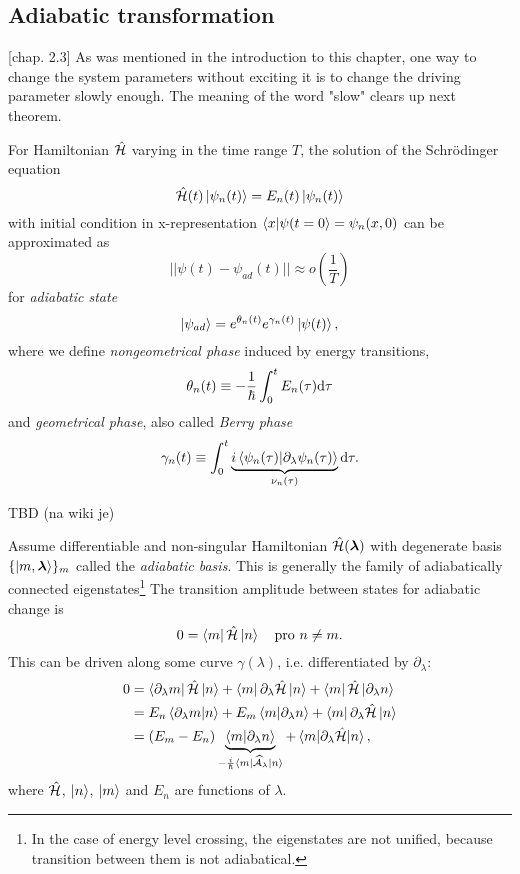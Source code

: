 \subsection{Adiabatic transformation}
\citep{kolodrubez}[chap. 2.3]
As was mentioned in the introduction to this chapter, one way to change the system parameters without exciting it is to change the driving parameter slowly enough. The meaning of the word "slow" clears up next theorem.
\begin{thm}
    For Hamiltonian $\hat{\mathcal{H}}$ varying in the time range $T$, the solution of the Schrödinger equation 
    $$\hat{\mathcal{H}}(t)\ket{\psi_n(t)} = E_n(t)\ket{\psi_n(t)}$$
    with initial condition in x-representation $\braket{x|\psi(t=0}=\psi_n(x,0)$ can be approximated as
    \begin{equation}
      ||\psi(t) - \psi_{ad}(t)||\approx o\left(\frac{1}{T}\right)
    \end{equation}
    for \emph{adiabatic state}
    \begin{equation}
        \ket{\psi_{ad}}= e^{\theta_n(t)}e^{\gamma_n(t)}\ket{\psi(t)},
    \end{equation}
    where we define \emph{nongeometrical phase} induced by energy transitions,
    $$\theta_n(t)\equiv -\frac{1}{\hbar}\int_0^t E_n(\tau)\mathrm{d} \tau$$
    and \emph{geometrical phase}, also called \emph{Berry phase}
        $$\gamma_n(t)\equiv \int_0^t \underbrace{i\braket{\psi_n(\tau)|\partial_\lambda\psi_n(\tau)}}_{\nu_n(\tau)} \mathrm{d} \tau .$$
\end{thm}
\begin{myproof}
    TBD (na wiki je)
\end{myproof}
Assume differentiable and non-singular Hamiltonian $\hat{\mathcal{H}}(\bm\lambda)$ with degenerate basis $\{\ket{m,\bm\lambda}\}_m$ called the \emph{adiabatic basis}. This is generally the family of adiabatically connected eigenstates\footnote{In the case of energy level crossing, the eigenstates are not unified, because transition between them is not adiabatical.} The transition amplitude between states for adiabatic change is
\begin{equation}
    0=\bra{m}\hat{\mathcal{H}}\ket{n} \quad \text{pro }n\neq m.
\end{equation}
This can be driven along some curve $\gamma(\lambda)$, i.e. differentiated by $\partial_\lambda$:
\begin{equation}
    \begin{split}
        0&=\bra{\partial_\lambda m}\hat{\mathcal{H}}\ket{n}+ \bra{m}\partial_\lambda\hat{\mathcal{H}}\ket{n}+ \bra{m}\hat{\mathcal{H}}\ket{\partial_\lambda n}\\
        &=E_n\braket{\partial_\lambda m|n} + E_m\braket{m|\partial_\lambda n}+ \bra{m}\partial_\lambda \hat{\mathcal{H}}\ket{n}\\
        &= (E_m-E_n)\underbrace{\braket{m|\partial_\lambda n}}_{-\frac{i}{\hbar}\bra{m}\mathcal{\widehat{A}}_\lambda\ket{n}} + \braket{m|\partial_\lambda\hat{\mathcal{H}}|n},
    \end{split}
\end{equation}
where $\hat{\mathcal{H}}$, $\ket{n}$, $\ket{m}$ and $E_n$ are functions of $\lambda$.

